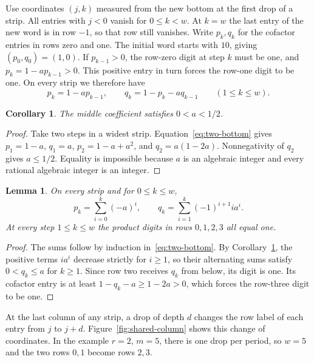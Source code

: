 \documentclass[11pt,reqno]{amsart}
\numberwithin{equation}{section}
\newtheorem{lemma}[theorem]{Lemma}
\newtheorem{corollary}[theorem]{Corollary}
\begin{document}
Use coordinates $(j,k)$ measured from the new bottom at the first drop of a strip. All entries with $j<0$ vanish for $0\le k<w$. At $k=w$ the last entry of the new word is in row $-1$, so that row still vanishes. Write $p_k,q_k$ for the cofactor entries in rows zero and one. The initial word starts with $10$, giving $(p_0,q_0)=(1,0)$. If $p_{k-1}>0$, the row-zero digit at step $k$ must be one, and $p_k=1-a p_{k-1}>0$. This positive entry in turn forces the row-one digit to be one. On every strip we therefore have
\begin{equation}\label{eq:two-bottom}
 p_k=1-a p_{k-1},\qquad q_k=1-p_k-aq_{k-1}\qquad(1\le k\le w).
\end{equation}

\begin{corollary}\label{cor:half}
The middle coefficient satisfies $0<a<1/2$.
\end{corollary}
\begin{proof}
Take two steps in a widest strip. Equation~\eqref{eq:two-bottom} gives $p_1=1-a$, $q_1=a$, $p_2=1-a+a^2$, and $q_2=a(1-2a)$. Nonnegativity of $q_2$ gives $a\le1/2$. Equality is impossible because $a$ is an algebraic integer and every rational algebraic integer is an integer.
\end{proof}

\begin{lemma}\label{lem:four}
On every strip and for $0\le k\le w$,
\[
 p_k=\sum_{i=0}^k(-a)^i,\qquad q_k=\sum_{i=1}^k(-1)^{i+1}i a^i.
\]
At every step $1\le k\le w$ the product digits in rows $0,1,2,3$ all equal one.
\end{lemma}
\begin{proof}
The sums follow by induction in~\eqref{eq:two-bottom}. By Corollary~\ref{cor:half}, the positive terms $i a^i$ decrease strictly for $i\ge1$, so their alternating sums satisfy $0<q_k\le a$ for $k\ge1$. Since row two receives $q_k$ from below, its digit is one. Its cofactor entry is at least $1-q_k-a\ge1-2a>0$, which forces the row-three digit to be one.
\end{proof}

At the last column of any strip, a drop of depth $d$ changes the row label of each entry from $j$ to $j+d$. Figure~\ref{fig:shared-column} shows this change of coordinates. In the example $r=2$, $m=5$, there is one drop per period, so $w=5$ and the two rows $0,1$ become rows $2,3$.
\end{document}
